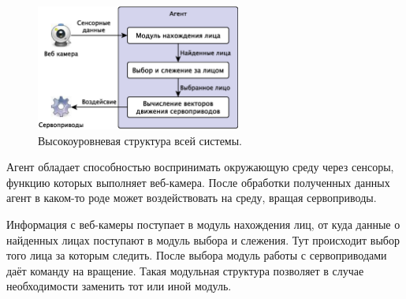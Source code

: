 \documentclass[12pt]{report}
\begin{document}
\begin{figure}[h]
	\centering
	\includegraphics[width=0.6\textwidth]{Pictures/Agent.eps}
	\caption{Высокоуровневая структура всей системы.}
	\label{fig:agent}
\end{figure}

Агент обладает способностью воспринимать окружающую среду через сенсоры, функцию которых выполняет веб-камера. После 
обработки полученных данных агент в каком-то роде может воздействовать на среду, вращая сервоприводы. \citep
{рассел2006искусственный}

Информация с веб-камеры поступает в модуль нахождения лиц, от куда данные о найденных лицах поступают в модуль выбора 
и слежения. Тут происходит выбор того лица за которым следить. После выбора модуль работы с сервоприводами даёт 
команду на вращение. Такая модульная структура позволяет в случае необходимости заменить тот или иной модуль. 
\end{document}
